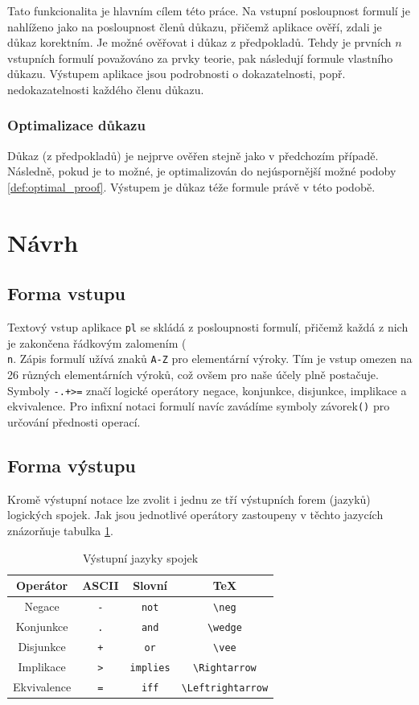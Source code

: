 \documentclass[thesis=B,czech,hidelinks]{thesis}[2012/06/26]
\begin{document}
Tato funkcionalita je hlavním cílem této práce. Na vstupní posloupnost formulí je nahlíženo jako na posloupnost členů důkazu, přičemž aplikace ověří, zdali je důkaz korektním. Je možné ověřovat i důkaz z předpokladů. Tehdy je prvních $n$ vstupních formulí považováno za prvky teorie, pak následují formule vlastního důkazu. Výstupem aplikace jsou podrobnosti o dokazatelnosti, popř. nedokazatelnosti každého členu důkazu.

\subsubsection{Optimalizace důkazu}

Důkaz (z předpokladů) je nejprve ověřen stejně jako v předchozím případě. Následně, pokud je to možné, je optimalizován do nejúspornější možné podoby \ref{def:optimal_proof}. Výstupem je důkaz téže formule právě v této podobě.

\section{Návrh}

\subsection{Forma vstupu}

Textový vstup aplikace \texttt{pl} se skládá z posloupnosti formulí, přičemž každá z nich je zakončena řádkovým zalomením (\texttt{\\n}. Zápis formulí užívá znaků \texttt{A-Z} pro elementární výroky. Tím je vstup omezen na 26 různých elementárních výroků, což ovšem pro naše účely plně postačuje. Symboly \texttt{-.+>=} značí logické operátory negace, konjunkce, disjunkce, implikace a ekvivalence. Pro infixní notaci formulí navíc zavádíme symboly závorek\texttt{()} pro určování přednosti operací.

\subsection{Forma výstupu}

Kromě výstupní notace lze zvolit i jednu ze tří výstupních forem (jazyků) logických spojek. Jak jsou jednotlivé operátory zastoupeny v těchto jazycích znázorňuje tabulka \ref{tab:connectives_language}.

\begin{table}
\centering
\caption{Výstupní jazyky spojek}
\label{tab:connectives_language}
\begin{tabular}{|c||c|c|c|}\hline
Operátor & ASCII & Slovní & \TeX \tabularnewline \hline \hline
Negace & \verb|-| & \verb|not| & \verb|\neg| \tabularnewline \hline
Konjunkce & \verb|.| & \verb|and| & \verb|\wedge| \tabularnewline \hline
Disjunkce & \verb|+| & \verb|or| & \verb|\vee| \tabularnewline \hline
Implikace & \verb|>| & \verb|implies| & \verb|\Rightarrow| \tabularnewline \hline
Ekvivalence & \verb|=| & \verb|iff| & \verb|\Leftrightarrow| \tabularnewline \hline
\end{tabular}
\end{table}
\end{document}
